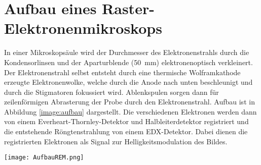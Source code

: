 \section{Aufbau eines Raster-Elektronenmikroskops}
\label{sec:aufbau}
In einer Mikroskopsäule wird der Durchmesser des Elektronenstrahls durch die Kondensorlinsen und der Aparturblende (\SI{50}{\milli\metre}) elektronenoptisch verkleinert. Der Elektronenstrahl selbst entsteht durch eine thermische Wolframkathode erzeugte Elektronenwolke, welche durch die Anode nach unten beschleunigt und durch die Stigmatoren fokussiert wird. Ablenkspulen sorgen dann  für zeilenförmigen Abrasterung der Probe durch den Elektronenstrahl. \citep{RasterEM} Aufbau ist in Abbildung \ref{image:aufbau} dargestellt. Die verschiedenen Elektronen werden dann von einem Everheart-Thornley-Detektor und Halbleiterdetektor registriert und die entstehende Röngtenstrahlung von einem EDX-Detektor. Dabei dienen die registrierten Elektronen als Signal zur Helligkeitsmodulation des Bildes. \citep{RasterEM}
\begin{center}
    \texttt{[image: AufbauREM.png]}
    \label{image:aufbau}
\end{center}

